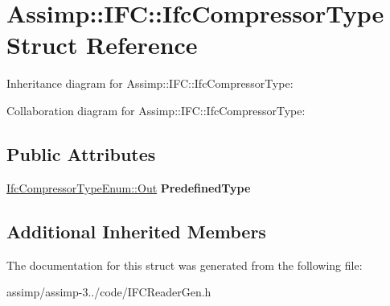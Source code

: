 \hypertarget{struct_assimp_1_1_i_f_c_1_1_ifc_compressor_type}{\section{Assimp\+:\+:I\+F\+C\+:\+:Ifc\+Compressor\+Type Struct Reference}
\label{struct_assimp_1_1_i_f_c_1_1_ifc_compressor_type}
}


Inheritance diagram for Assimp\+:\+:I\+F\+C\+:\+:Ifc\+Compressor\+Type\+:


Collaboration diagram for Assimp\+:\+:I\+F\+C\+:\+:Ifc\+Compressor\+Type\+:
\subsection*{Public Attributes}
\begin{DoxyCompactItemize}
\item 
\hypertarget{struct_assimp_1_1_i_f_c_1_1_ifc_compressor_type_a5e3c0d579c7615de90ba23baabd100ae}{\hyperlink{classboost_1_1shared__ptr}{Ifc\+Compressor\+Type\+Enum\+::\+Out} {\bfseries Predefined\+Type}}\label{struct_assimp_1_1_i_f_c_1_1_ifc_compressor_type_a5e3c0d579c7615de90ba23baabd100ae}

\end{DoxyCompactItemize}
\subsection*{Additional Inherited Members}


The documentation for this struct was generated from the following file\+:\begin{DoxyCompactItemize}
\item 
assimp/assimp-\/3../code/I\+F\+C\+Reader\+Gen.\+h\end{DoxyCompactItemize}
